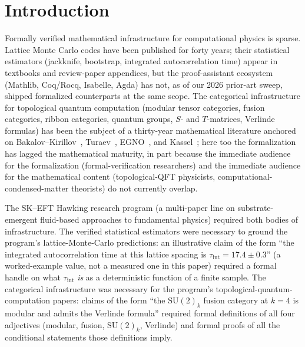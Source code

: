 \documentclass[11pt]{article}
\begin{document}

\section{Introduction}
\label{sec:intro}

Formally verified mathematical infrastructure for computational
physics is sparse. Lattice Monte Carlo codes have been published for
forty years; their statistical estimators (jackknife, bootstrap,
integrated autocorrelation time) appear in textbooks and
review-paper appendices, but the proof-assistant ecosystem (Mathlib,
Coq/Rocq, Isabelle, Agda) has not, as of our 2026 prior-art sweep,
shipped formalized counterparts at the same scope. The categorical
infrastructure for topological quantum computation
(modular tensor categories, fusion categories, ribbon categories,
quantum groups, $S$- and $T$-matrices, Verlinde formulas) has been
the subject of a thirty-year mathematical literature anchored on
Bakalov--Kirillov~\cite{bakalov2001},
Turaev~\cite{turaev2010}, EGNO~\cite{egno2015}, and
Kassel~\cite{kassel1995}; here too the formalization has lagged
the mathematical maturity, in part because
the immediate audience for the formalization (formal-verification
researchers) and the immediate audience for the mathematical content
(topological-QFT physicists, computational-condensed-matter theorists)
do not currently overlap.

The SK--EFT Hawking research program (a multi-paper line on
substrate-emergent fluid-based approaches to fundamental physics)
required both bodies of infrastructure. The verified statistical
estimators were necessary to ground the program's lattice-Monte-Carlo
predictions: an illustrative claim of the form ``the integrated
autocorrelation time at this lattice spacing is
$\tau_{\mathrm{int}} = 17.4 \pm 0.3$'' (a worked-example value, not
a measured one in this paper) required a formal handle on what
$\tau_{\mathrm{int}}$ \emph{is} as a deterministic function of a
finite sample. The categorical
infrastructure was necessary for the program's
topological-quantum-computation papers: claims of the form ``the
$\mathrm{SU}(2)_k$ fusion category at $k=4$ is modular and admits
the Verlinde formula'' required formal definitions of all four
adjectives (modular, fusion, $\mathrm{SU}(2)_k$, Verlinde) and
formal proofs of all the conditional statements those definitions
imply.
\end{document}

